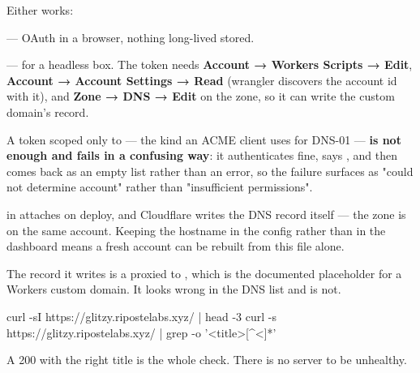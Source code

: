 \documentclass[fontpath=fonts/,logopath=logo/]{riposte-doc}
\begin{document}

Either works:

\begin{ripbullets}
\item \textbf{} — OAuth in a browser, nothing long-lived stored.
\item \textbf{} — for a headless box. The token needs \textbf{Account → Workers Scripts → Edit}, \textbf{Account → Account Settings → Read} (wrangler discovers the account id with it), and \textbf{Zone → DNS → Edit} on the zone, so it can write the custom domain's record.
\end{ripbullets}

A token scoped only to  — the kind an ACME client uses for DNS-01 — \textbf{is not enough and fails in a confusing way}: it authenticates fine,  says , and then  comes back as an empty list rather than an error, so the failure surfaces as "could not determine account" rather than "insufficient permissions".



 in  attaches  on deploy, and Cloudflare writes the DNS record itself — the zone is on the same account. Keeping the hostname in the config rather than in the dashboard means a fresh account can be rebuilt from this file alone.

The record it writes is a proxied  to , which is the documented placeholder for a Workers custom domain. It looks wrong in the DNS list and is not.



\ripcodeopen
{}
\begin{ripcodeblock}
curl -sI https://glitzy.ripostelabs.xyz/ | head -3
curl -s  https://glitzy.ripostelabs.xyz/ | grep -o '<title>[^<]*'
\end{ripcodeblock}
\ripcodesizereset\ripcodeclose

A 200 with the right title is the whole check. There is no server to be unhealthy.


\end{document}
